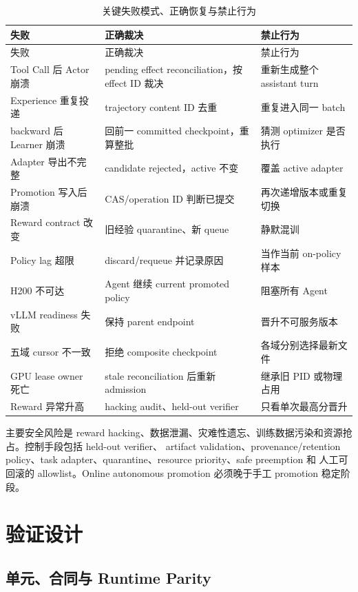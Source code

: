 \documentclass[UTF8,11pt,a4paper]{ctexart}
\begin{document}
\begin{longtable}{L{3.4cm}L{5.3cm}L{5.0cm}}
  \caption{关键失败模式、正确恢复与禁止行为}\label{tab:failure}\\
  \toprule
  失败 & 正确裁决 & 禁止行为 \\
  \midrule
  \endfirsthead
  \toprule
  失败 & 正确裁决 & 禁止行为 \\
  \midrule
  \endhead
  Tool Call 后 Actor 崩溃 & pending effect reconciliation，按 effect ID 裁决 & 重新生成整个 assistant turn \\
  Experience 重复投递 & trajectory content ID 去重 & 重复进入同一 batch \\
  backward 后 Learner 崩溃 & 回前一 committed checkpoint，重算整批 & 猜测 optimizer 是否执行 \\
  Adapter 导出不完整 & candidate rejected，active 不变 & 覆盖 active adapter \\
  Promotion 写入后崩溃 & CAS/operation ID 判断已提交 & 再次递增版本或重复切换 \\
  Reward contract 改变 & 旧经验 quarantine、新 queue & 静默混训 \\
  Policy lag 超限 & discard/requeue 并记录原因 & 当作当前 on-policy 样本 \\
  H200 不可达 & Agent 继续 current promoted policy & 阻塞所有 Agent \\
  vLLM readiness 失败 & 保持 parent endpoint & 晋升不可服务版本 \\
  五域 cursor 不一致 & 拒绝 composite checkpoint & 各域分别选择最新文件 \\
  GPU lease owner 死亡 & stale reconciliation 后重新 admission & 继承旧 PID 或物理占用 \\
  Reward 异常升高 & hacking audit、held-out verifier & 只看单次最高分晋升 \\
  \bottomrule
\end{longtable}

主要安全风险是 reward hacking、数据泄漏、灾难性遗忘、训练数据污染和资源抢占。控制手段包括 held-out verifier、
artifact validation、provenance/retention policy、task adapter、quarantine、resource priority、safe preemption 和
人工可回滚的 allowlist。Online autonomous promotion 必须晚于手工 promotion 稳定阶段。

\section{验证设计}

\subsection{单元、合同与 Runtime Parity}
\end{document}
